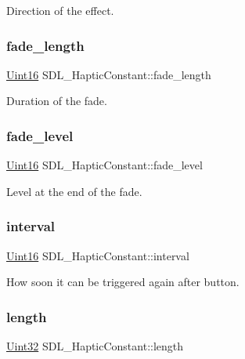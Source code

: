 Direction of the effect. \mbox{\label{struct_s_d_l___haptic_constant_a647a6b761ac6ba16160d0892a12806bc}} 
\subsubsection{\texorpdfstring{fade\_length}{fade\_length}}
{\footnotesize\ttfamily \mbox{\hyperlink{_s_d_l__stdinc_8h_a31fcc0a076c9068668173ee26d33e42b}{Uint16}} S\+D\+L\+\_\+\+Haptic\+Constant\+::fade\+\_\+length}

Duration of the fade. \mbox{\label{struct_s_d_l___haptic_constant_a49f6499c89f3e494efbe92f12277c949}} 
\subsubsection{\texorpdfstring{fade\_level}{fade\_level}}
{\footnotesize\ttfamily \mbox{\hyperlink{_s_d_l__stdinc_8h_a31fcc0a076c9068668173ee26d33e42b}{Uint16}} S\+D\+L\+\_\+\+Haptic\+Constant\+::fade\+\_\+level}

Level at the end of the fade. \mbox{\label{struct_s_d_l___haptic_constant_ab1f7f0df856f4cf1fdf937cb886226b4}} 
\subsubsection{\texorpdfstring{interval}{interval}}
{\footnotesize\ttfamily \mbox{\hyperlink{_s_d_l__stdinc_8h_a31fcc0a076c9068668173ee26d33e42b}{Uint16}} S\+D\+L\+\_\+\+Haptic\+Constant\+::interval}

How soon it can be triggered again after button. \mbox{\label{struct_s_d_l___haptic_constant_aeb994c356b1d236b060f277d157e98ec}} 
\subsubsection{\texorpdfstring{length}{length}}
{\footnotesize\ttfamily \mbox{\hyperlink{_s_d_l__stdinc_8h_add440eff171ea5f55cb00c4a9ab8672d}{Uint32}} S\+D\+L\+\_\+\+Haptic\+Constant\+::length}

